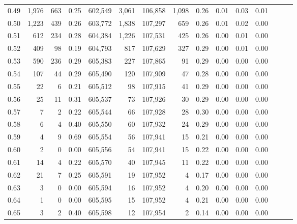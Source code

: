 \begin{tabular}{rrrrrrrrrrrrrrr}
0.49 &   1,976 &    663 &  0.25 &  602,549 &    3,061 &  106,858 &    1,098 &  0.26 &  0.01 &  0.03 &      0.01 \\
0.50 &   1,223 &    439 &  0.26 &  603,772 &    1,838 &  107,297 &      659 &  0.26 &  0.01 &  0.02 &      0.00 \\
0.51 &     612 &    234 &  0.28 &  604,384 &    1,226 &  107,531 &      425 &  0.26 &  0.00 &  0.01 &      0.00 \\
0.52 &     409 &     98 &  0.19 &  604,793 &      817 &  107,629 &      327 &  0.29 &  0.00 &  0.01 &      0.00 \\
0.53 &     590 &    236 &  0.29 &  605,383 &      227 &  107,865 &       91 &  0.29 &  0.00 &  0.00 &      0.00 \\
0.54 &     107 &     44 &  0.29 &  605,490 &      120 &  107,909 &       47 &  0.28 &  0.00 &  0.00 &      0.00 \\
0.55 &      22 &      6 &  0.21 &  605,512 &       98 &  107,915 &       41 &  0.29 &  0.00 &  0.00 &      0.00 \\
0.56 &      25 &     11 &  0.31 &  605,537 &       73 &  107,926 &       30 &  0.29 &  0.00 &  0.00 &      0.00 \\
0.57 &       7 &      2 &  0.22 &  605,544 &       66 &  107,928 &       28 &  0.30 &  0.00 &  0.00 &      0.00 \\
0.58 &       6 &      4 &  0.40 &  605,550 &       60 &  107,932 &       24 &  0.29 &  0.00 &  0.00 &      0.00 \\
0.59 &       4 &      9 &  0.69 &  605,554 &       56 &  107,941 &       15 &  0.21 &  0.00 &  0.00 &      0.00 \\
0.60 &       2 &      0 &  0.00 &  605,556 &       54 &  107,941 &       15 &  0.22 &  0.00 &  0.00 &      0.00 \\
0.61 &      14 &      4 &  0.22 &  605,570 &       40 &  107,945 &       11 &  0.22 &  0.00 &  0.00 &      0.00 \\
0.62 &      21 &      7 &  0.25 &  605,591 &       19 &  107,952 &        4 &  0.17 &  0.00 &  0.00 &      0.00 \\
0.63 &       3 &      0 &  0.00 &  605,594 &       16 &  107,952 &        4 &  0.20 &  0.00 &  0.00 &      0.00 \\
0.64 &       1 &      0 &  0.00 &  605,595 &       15 &  107,952 &        4 &  0.21 &  0.00 &  0.00 &      0.00 \\
0.65 &       3 &      2 &  0.40 &  605,598 &       12 &  107,954 &        2 &  0.14 &  0.00 &  0.00 &      0.00 \\

\end{tabular}

